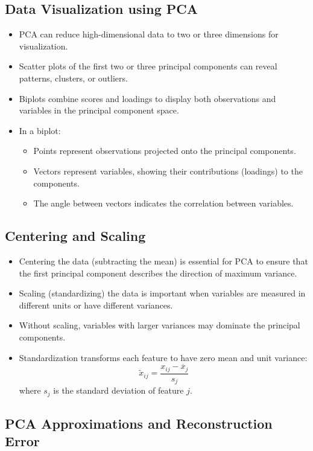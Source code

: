 \documentclass{article}
\begin{document}
\subsection{Data Visualization using PCA}

\begin{itemize}
    \item PCA can reduce high-dimensional data to two or three dimensions for visualization.
    \item Scatter plots of the first two or three principal components can reveal patterns, clusters, or outliers.
    \item Biplots combine scores and loadings to display both observations and variables in the principal component space.
    \item In a biplot:
    \begin{itemize}
        \item Points represent observations projected onto the principal components.
        \item Vectors represent variables, showing their contributions (loadings) to the components.
        \item The angle between vectors indicates the correlation between variables.
    \end{itemize}
\end{itemize}

\subsection{Centering and Scaling}

\begin{itemize}
    \item Centering the data (subtracting the mean) is essential for PCA to ensure that the first principal component describes the direction of maximum variance.
    \item Scaling (standardizing) the data is important when variables are measured in different units or have different variances.
    \item Without scaling, variables with larger variances may dominate the principal components.
    \item Standardization transforms each feature to have zero mean and unit variance:
    \[
    \tilde{x}_{ij} = \frac{x_{ij} - \overline{x}_j}{s_j}
    \]
    where $s_j$ is the standard deviation of feature $j$.
\end{itemize}

\subsection{PCA Approximations and Reconstruction Error}
\end{document}
